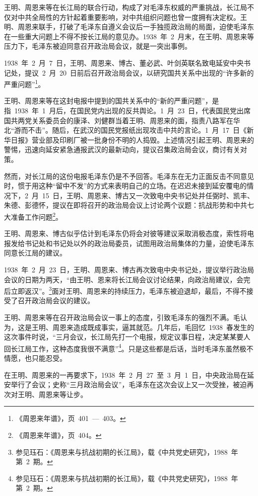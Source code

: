 王明、周恩来等在长江局的联合行动，构成了对毛泽东权威的严重挑战，长江局不仅对中共全局性的方针起着重要影响，对中共组织问题也曾一度拥有决定权。王明、周恩来联手，打破了毛泽东自遵义会议后一手独揽政治局的局面，迫使毛泽东在一些重大问题上不得不按长江局的意见办。1938~年~2~月末，在王明、周恩来等压力下，毛泽东被迫同意召开政治局会议，就是一突出事例。

1938~年~2~月~7~日，王明、周恩来、博古、董必武、叶剑英联名致电延安中央书记处，提议~2~月~20~日前后召开政治局会议，以研究国共关系中出现的“许多新的严重问题”\footnote{《周恩来年谱》，页~401~—~403。}。

王明、周恩来等在这封电报中提到的国共关系中的“新的严重问题”，是指~1938~年~1~月后，在国民党内出现的反共舆论。1~月~23~日，代表国民党出席国共两党关系委员会的康泽、刘健群当着王明、周恩来的面，指责八路军在华北“游而不击”。随后，在武汉的国民党报纸出现攻击中共的言论。1~月~17~日《新华日报》营业部及印刷厂被一批身份不明的人捣毁。上述情况引起王明、周恩来的警惕，迅速向延安紧急通报武汉的最新动向，提议召集政治局会议，商讨有关对策。

然而，对长江局的这份电报毛泽东仍是不予回答。毛泽东在无力正面反击不同意见时，惯于用这种“留中不发”的方式来表明自己的立场。在迟迟未接到延安覆电的情况下，2~月~15~日，王明、周恩来、博古又一次致电中央书记处并任弼时、凯丰、朱德、彭德怀，提议在即将召开的政治局会议上讨论两个议题：抗战形势和中共七大准备工作问题\footnote{《周恩来年谱》，页~404。}。

王明、周恩来、博古似乎估计到毛泽东仍将会对彼等建议采取消极态度，索性将电报发给书记处和书记处以外的政治局委员，试图用政治局集体的力量，迫使毛泽东同意长江局的建议。

1938~年~2~月~23~日，王明、周恩来、博古再次致电中央书记处，提议举行政治局会议的日期为两天，“由王明、恩来将长江局会议讨论结果，向政治局建议，会完后立即返汉”。\footnote{参见珏石：《周恩来与抗战初期的长江局》，载《中共党史研究》，1988~年第~2~期。}面对王明、周恩来的持续压力，毛泽东被迫退却，最后，不得不接受了召开政治局会议的建议。

王明、周恩来等在召开政治局会议一事上的态度，引致毛泽东的强烈不满。毛认为，这是王明、周恩来造成既成事实，逼其就范。几年后，毛回忆~1938~春发生的这次事件时说，“三月会议，长江局先打一个电报，规定议事日程，决定某某要人回长江局工作，这种态度我很不满意”\footnote{参见珏石：《周恩来与抗战初期的长江局》，载《中共党史研究》，1988~年第~2~期。}。只是这些都是后话，当时毛泽东虽然极不情愿，也只能忍受。

在王明、周恩来的一再要求下，1938~年~2~月~27~至~3~月~1~日，中央政治局在延安举行了会议；史称“三月政治局会议”，毛泽东在这次会议上又一次受挫，被迫再次对王明、周恩来等让步。

